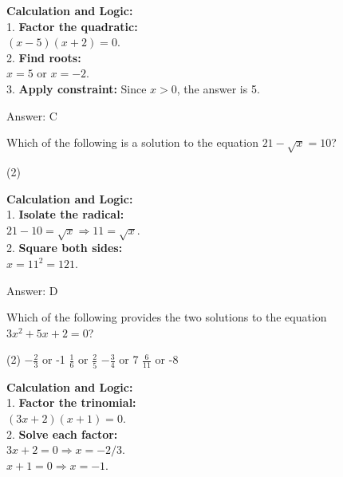 \documentclass[11pt,paper=a4,answers]{exam}
\begin{document}
\begin{questions}
\begin{solution}
\textbf{Calculation and Logic:} \\
1. \textbf{Factor the quadratic:} \\
$(x-5)(x+2) = 0$. \\
2. \textbf{Find roots:} \\
$x = 5$ or $x = -2$. \\
3. \textbf{Apply constraint:} Since $x > 0$, the answer is 5.

\vspace{30pt}

Answer: \colorbox{yellow!100}{C}
\end{solution}

\vspace{60pt}

\question
Which of the following is a solution to the equation $21 - \sqrt{x} = 10$?
\begin{tasks}(2)
\end{tasks}

\begin{solution}
\textbf{Calculation and Logic:} \\
1. \textbf{Isolate the radical:} \\
$21 - 10 = \sqrt{x} \Rightarrow 11 = \sqrt{x}$. \\
2. \textbf{Square both sides:} \\
$x = 11^2 = 121$.

\vspace{30pt}

Answer: \colorbox{yellow!100}{D}
\end{solution}

\vspace{60pt}

\question
Which of the following provides the two solutions to the equation $3x^2 + 5x + 2 = 0$?
\begin{tasks}(2)
    \task $-\frac{2}{3}$ or -1
    \task $\frac{1}{6}$ or $\frac{2}{5}$
    \task $-\frac{3}{4}$ or 7
    \task $\frac{6}{11}$ or -8
\end{tasks}

\begin{solution}
\textbf{Calculation and Logic:} \\
1. \textbf{Factor the trinomial:} \\
$(3x+2)(x+1) = 0$. \\
2. \textbf{Solve each factor:} \\
$3x+2 = 0 \Rightarrow x = -2/3$. \\
$x+1 = 0 \Rightarrow x = -1$.


\end{solution}
\end{questions}
\end{document}

